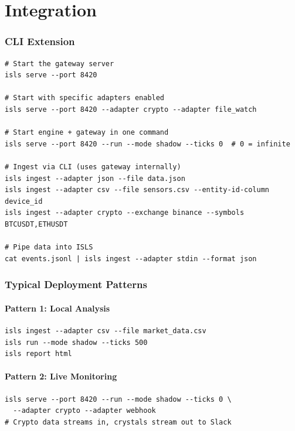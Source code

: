 \documentclass[11pt,a4paper,twoside]{article}
\theoremstyle{definition}
\theoremstyle{plain}
\theoremstyle{remark}
\begin{document}
\part{Integration}\label{part:integration}

\section{CLI Extension}\label{sec:cli}

\begin{lstlisting}
# Start the gateway server
isls serve --port 8420

# Start with specific adapters enabled
isls serve --port 8420 --adapter crypto --adapter file_watch

# Start engine + gateway in one command
isls serve --port 8420 --run --mode shadow --ticks 0  # 0 = infinite

# Ingest via CLI (uses gateway internally)
isls ingest --adapter json --file data.json
isls ingest --adapter csv --file sensors.csv --entity-id-column device_id
isls ingest --adapter crypto --exchange binance --symbols BTCUSDT,ETHUSDT

# Pipe data into ISLS
cat events.jsonl | isls ingest --adapter stdin --format json
\end{lstlisting}


\section{Typical Deployment Patterns}\label{sec:deploy}

\subsection{Pattern 1: Local Analysis}

\begin{lstlisting}
isls ingest --adapter csv --file market_data.csv
isls run --mode shadow --ticks 500
isls report html
\end{lstlisting}

\subsection{Pattern 2: Live Monitoring}

\begin{lstlisting}
isls serve --port 8420 --run --mode shadow --ticks 0 \
  --adapter crypto --adapter webhook
# Crypto data streams in, crystals stream out to Slack
\end{lstlisting}
\end{document}
